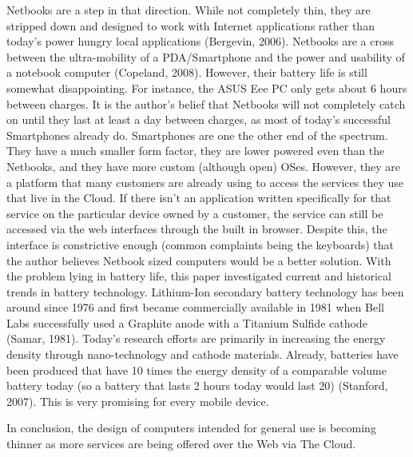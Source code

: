 \documentclass[12pt,oneside,letterpaper]{article}
\begin{document}
Netbooks are a step in that direction.  While not completely thin, they are
stripped down and designed to work with Internet applications rather than
today's power hungry local applications (Bergevin, 2006).  Netbooks are a cross
between the ultra-mobility of a PDA/Smartphone and the power and usability of a
notebook computer (Copeland, 2008).  However, their battery life is still
somewhat disappointing.  For instance, the ASUS Eee PC only gets about 6 hours
between charges.  It is the author's belief that Netbooks will not completely
catch on until they last at least a day between charges, as most of today's
successful Smartphones already do.  Smartphones are one the other end of the
spectrum.  They have a much smaller form factor, they are lower powered even
than the Netbooks, and they have more custom (although open) OSes.  However,
they are a platform that many customers are already using to access the services
they use that live in the Cloud.  If there isn't an application written
specifically for that service on the particular device owned by a customer, the
service can still be accessed via the web interfaces through the built in
browser.  Despite this, the interface is constrictive enough (common complaints
being the keyboards) that the author believes Netbook sized computers would be a
better solution.  With the problem lying in battery life, this paper
investigated current and historical trends in battery technology.  Lithium-Ion
secondary battery technology has been around since 1976 and first became
commercially available in 1981 when Bell Labs successfully used a Graphite anode
with a Titanium Sulfide cathode (Samar, 1981).  Today's research efforts are
primarily in increasing the energy density through nano-technology and cathode
materials.  Already, batteries have been produced that have 10 times the energy
density of a comparable volume battery today (so a battery that lasts 2 hours
today would last 20) (Stanford, 2007).  This is very promising for every mobile
device.

In conclusion, the design of computers intended for general use is becoming
thinner as more services are being offered over the Web via The Cloud.
\end{document}
